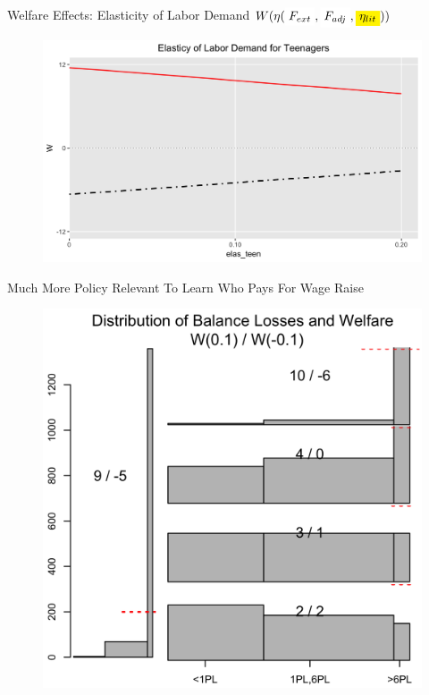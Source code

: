 \documentclass{beamer}
\newcommand{\highlight}[1]{\colorbox{yellow}{$\displaystyle #1$}}
\newcommand{\highlightw}[1]{\colorbox{white}{$\displaystyle #1$}}
\begin{document}
\begin{frame}[noframenumbering]{Welfare Effects: Elasticity of Labor Demand $W(\eta( \highlightw{F_{ext}}, \highlightw{F_{adj}},\highlight{\eta_{lit}}))$ }
\begin{figure}[h!]
\centering
\hspace{-1em}
\includegraphics[scale = 0.13]{../Images/sa_eta}
\end{figure}	
\end{frame}



\begin{frame}{Much More Policy Relevant To Learn Who Pays For Wage Raise}
\begin{figure}[h!]
\vspace{-0em}
\centering
\includegraphics[scale = 0.09]{../Images/sa_DLf}
\label{SA_3}
\end{figure}	
\end{frame}
\end{document}

